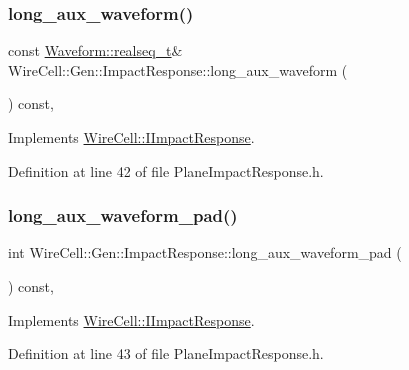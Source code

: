 \subsubsection{\texorpdfstring{long\+\_\+aux\+\_\+waveform()}{long\_aux\_waveform()}}
{\footnotesize\ttfamily const \hyperlink{namespace_wire_cell_1_1_waveform_a479175e541c8545e87cd8063b74b6956}{Waveform\+::realseq\+\_\+t}\& Wire\+Cell\+::\+Gen\+::\+Impact\+Response\+::long\+\_\+aux\+\_\+waveform (\begin{DoxyParamCaption}{ }\end{DoxyParamCaption}) const\hspace{0.3cm}{\ttfamily [inline]}, {\ttfamily [virtual]}}



Implements \hyperlink{class_wire_cell_1_1_i_impact_response_ac4f1779e2e202ddb853ec1df8fd38d6d}{Wire\+Cell\+::\+I\+Impact\+Response}.



Definition at line 42 of file Plane\+Impact\+Response.\+h.

\mbox{\label{class_wire_cell_1_1_gen_1_1_impact_response_a0ea37ecd9dfc58b77c11dd8599128f14}} 
\subsubsection{\texorpdfstring{long\+\_\+aux\+\_\+waveform\+\_\+pad()}{long\_aux\_waveform\_pad()}}
{\footnotesize\ttfamily int Wire\+Cell\+::\+Gen\+::\+Impact\+Response\+::long\+\_\+aux\+\_\+waveform\+\_\+pad (\begin{DoxyParamCaption}{ }\end{DoxyParamCaption}) const\hspace{0.3cm}{\ttfamily [inline]}, {\ttfamily [virtual]}}



Implements \hyperlink{class_wire_cell_1_1_i_impact_response_a2f9b7f14cf42e37639c193238f357c43}{Wire\+Cell\+::\+I\+Impact\+Response}.



Definition at line 43 of file Plane\+Impact\+Response.\+h.

